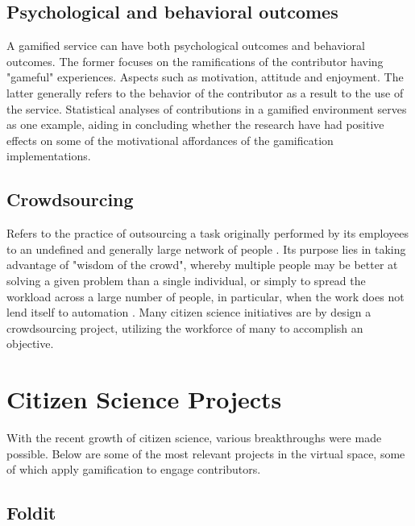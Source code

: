 \subsection{Psychological and behavioral outcomes}

A gamified service can have both psychological outcomes and behavioral outcomes. The former focuses on the ramifications of the contributor having "gameful" experiences. Aspects such as motivation, attitude and enjoyment. The latter generally refers to the behavior of the contributor as a result to the use of the service. Statistical analyses of contributions in a gamified environment serves as one example, aiding in concluding whether the research have had positive effects on some of the motivational affordances of the gamification implementations.

\subsection{Crowdsourcing}

Refers to the practice of outsourcing a task originally performed by its employees to an undefined and generally large network of people \cite{howe2006rise}. Its purpose lies in taking advantage of "wisdom of the crowd", whereby multiple people may be better at solving a given problem than a single individual, or simply to spread the workload across a large number of people, in particular, when the work does not lend itself to automation \cite{kreitmair2019citizen}. Many citizen science initiatives are by design a crowdsourcing project, utilizing the workforce of many to accomplish an objective.

\section{Citizen Science Projects}

With the recent growth of citizen science, various breakthroughs were made possible. Below are some of the most relevant projects in the virtual space, some of which apply gamification to engage contributors.

\subsection{Foldit}


